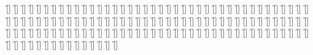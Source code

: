 \begin{questions}
\begin{multicols}{2}
        \question  \f[]
        \question  \f[]
        \question  \f[]
        \question  \f[]
        \question  \f[]
        \question  \f[]
        \question  \f[]
        \question  \f[]
        \question  \f[]
        \question  \f[]
        \question  \f[]
        \question  \f[]
        \question  \f[]
        \question  \f[]
        \question  \f[]
        \question  \f[]
        \question  \f[]
        \question  \f[]
        \question  \f[]
        \question  \f[]
        \question  \f[]
        \question  \f[]
        \question  \f[]
        \question  \f[]
        \question  \f[]
        \question  \f[]
        \question  \f[]
        \question  \f[]
        \question  \f[]
        \question  \f[]
        \question  \f[]
        \question  \f[]
        \question  \f[]
        \question  \f[]
        \question  \f[]
        \question  \f[]
        \question  \f[]
        \question  \f[]
        \question  \f[]
        \question  \f[]
        \question  \f[]
        \question  \f[]
        \question  \f[]
        \question  \f[]
        \question  \f[]
        \question  \f[]
        \question  \f[]
        \question  \f[]
        \question  \f[]
        \question  \f[]
        \question  \f[]
        \question  \f[]
        \question  \f[]
        \question  \f[]
        \question  \f[]
        \question  \f[]
        \question  \f[]
        \question  \f[]
        \question  \f[]
        \question  \f[]
        \question  \f[]
        \question  \f[]
        \question  \f[]
        \question  \f[]
        \question  \f[]
        \question  \f[]
        \question  \f[]
        \question  \f[]
        \question  \f[]
        \question  \f[]
        \question  \f[]
        \question  \f[]
        \question  \f[]
        \question  \f[]
        \question  \f[]
        \question  \f[]
        \question  \f[]
        \question  \f[]
        \question  \f[]
        \question  \f[]
        \question  \f[]
        \question  \f[]
        \question  \f[]
        \question  \f[]
        \question  \f[]
        \question  \f[]
        \question  \f[]
        \question  \f[]
        \question  \f[]
        \question  \f[]
        \question  \f[]
        \question  \f[]
        \question  \f[]
        \question  \f[]
        \question  \f[]
        \question  \f[]
        \question  \f[]
        \question  \f[]
        \question  \f[]
        \question  \f[]
        \question  \f[]
        \question  \f[]
        \question  \f[]
        \question  \f[]
        \question  \f[]
        \question  \f[]
        \question  \f[]
        \question  \f[]
        \question  \f[]
        \question  \f[]
        \question  \f[]
        \question  \f[]
        \question  \f[]
        \question  \f[]
        \question  \f[]
        \question  \f[]
        \question  \f[]
        \question  \f[]
        \question  \f[]
        \question  \f[]
        \question  \f[]
        \question  \f[]
        \question  \f[]
        \question  \f[]
        \question  \f[]
        \question  \f[]
        \question  \f[]
        \question  \f[]
        \question  \f[]
        \question  \f[]
        \question  \f[]
        \question  \f[]
        \question  \f[]
        \question  \f[]
        \question  \f[]
    \end{multicols}
\end{questions}
